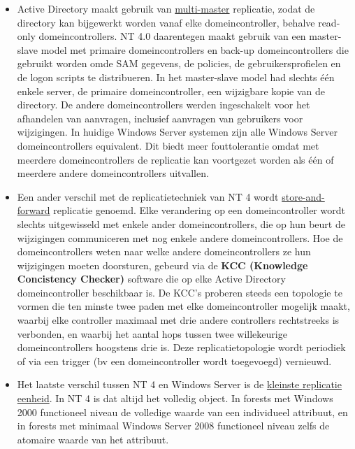 \documentclass{report}
\begin{document}
\begin{enumerate}
		 { 
			\begin{itemize}
				\item Active Directory maakt gebruik van \underline{multi-master} replicatie, zodat de directory kan bijgewerkt worden vanaf elke domeincontroller, behalve read-only domeincontrollers. NT 4.0 daarentegen maakt gebruik van een master-slave model met primaire domeincontrollers en back-up domeincontrollers die gebruikt worden omde SAM gegevens, de policies, de gebruikersprofielen en de logon scripts te distribueren. In het master-slave model had slechts één enkele server, de primaire domeincontroller, een wijzigbare kopie van de directory. De andere domeincontrollers werden ingeschakelt voor het afhandelen van aanvragen, inclusief aanvragen van gebruikers voor wijzigingen. In huidige Windows Server systemen zijn alle Windows Server domeincontrollers equivalent. Dit biedt meer fouttolerantie omdat met meerdere domeincontrollers de replicatie kan voortgezet worden als één of meerdere andere domeincontrollers uitvallen. 
				\item Een ander verschil met de replicatietechniek van NT 4 wordt \underline{store-and-forward} replicatie genoemd. Elke verandering op een domeincontroller wordt slechts uitgewisseld met enkele ander domeincontrollers, die op hun beurt de wijzigingen communiceren met nog enkele andere domeincontrollers. Hoe de domeincontrollers weten naar welke andere domeincontrollers ze hun wijzigingen moeten doorsturen, gebeurd via de \textbf{KCC (Knowledge Concistency Checker)} software die op elke Active Directory domeincontroller beschikbaar is. De KCC's proberen steeds een topologie te vormen die ten minste twee paden met elke domeincontroller mogelijk maakt, waarbij elke controller maximaal met drie andere controllers rechtstreeks is verbonden, en waarbij het aantal hops tussen twee willekeurige domeincontrollers hoogstens drie is. Deze replicatietopologie wordt periodiek of via een trigger (bv een domeincontroller wordt toegevoegd) vernieuwd. 
				\item Het laatste verschil tussen NT 4 en Windows Server is de \underline{kleinste replicatie eenheid}. In NT 4 is dat altijd het volledig object. In forests met Windows 2000 functioneel niveau de volledige waarde van een individueel attribuut, en in forests met minimaal Windows Server 2008 functioneel niveau zelfs de atomaire waarde van het attribuut. 

\end{itemize}}
\end{enumerate}
\end{document}
